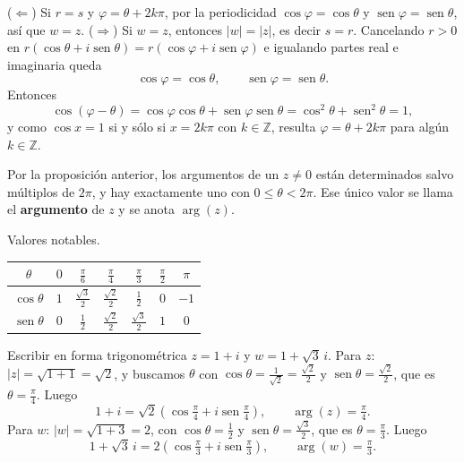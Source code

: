 \begin{demostracion}
($\Leftarrow$) Si $r=s$ y $\varphi=\theta+2k\pi$, por la periodicidad
$\cos\varphi=\cos\theta$ y $\operatorname{sen}\varphi=\operatorname{sen}\theta$,
así que $w=z$.
($\Rightarrow$) Si $w=z$, entonces $|w|=|z|$, es decir $s=r$. Cancelando $r>0$ en
$r(\cos\theta+i\operatorname{sen}\theta)=r(\cos\varphi+i\operatorname{sen}\varphi)$
e igualando partes real e imaginaria queda
\[
\cos\varphi=\cos\theta, \qquad \operatorname{sen}\varphi=\operatorname{sen}\theta.
\]
Entonces
\[
\cos(\varphi-\theta)=\cos\varphi\cos\theta+\operatorname{sen}\varphi\operatorname{sen}\theta
=\cos^2\theta+\operatorname{sen}^2\theta=1,
\]
y como $\cos x=1$ si y sólo si $x=2k\pi$ con $k\in\mathbb{Z}$, resulta
$\varphi=\theta+2k\pi$ para algún $k\in\mathbb{Z}$.
\end{demostracion}
\begin{definicion}
Por la proposición anterior, los argumentos de un $z\neq 0$ están determinados
salvo múltiplos de $2\pi$, y hay exactamente uno con $0\le\theta<2\pi$. Ese
único valor se llama el \textbf{argumento} de $z$ y se anota $\arg(z)$.
\end{definicion}
\begin{nota}{Valores notables.}
\begin{center}
\renewcommand{\arraystretch}{1.8}
\begin{tabular}{|c|c|c|c|c|c|c|}
\hline
$\theta$ & $0$ & $\frac{\pi}{6}$ & $\frac{\pi}{4}$ & $\frac{\pi}{3}$ & $\frac{\pi}{2}$ & $\pi$ \\
\hline
$\cos\theta$ & $1$ & $\frac{\sqrt{3}}{2}$ & $\frac{\sqrt{2}}{2}$ & $\frac{1}{2}$ & $0$ & $-1$ \\
\hline
$\operatorname{sen}\theta$ & $0$ & $\frac{1}{2}$ & $\frac{\sqrt{2}}{2}$ & $\frac{\sqrt{3}}{2}$ & $1$ & $0$ \\
\hline
\end{tabular}
\end{center}
\end{nota}
\begin{ejemplo}
Escribir en forma trigonométrica $z=1+i$ y $w=1+\sqrt{3}\,i$.
Para $z$: $|z|=\sqrt{1+1}=\sqrt{2}$, y buscamos $\theta$ con
$\cos\theta=\tfrac{1}{\sqrt{2}}=\tfrac{\sqrt{2}}{2}$ y
$\operatorname{sen}\theta=\tfrac{\sqrt{2}}{2}$, que es $\theta=\tfrac{\pi}{4}$. Luego
\[
1+i=\sqrt{2}\left(\cos\tfrac{\pi}{4}+i\operatorname{sen}\tfrac{\pi}{4}\right),
\qquad \arg(z)=\tfrac{\pi}{4}.
\]
Para $w$: $|w|=\sqrt{1+3}=2$, con $\cos\theta=\tfrac{1}{2}$ y
$\operatorname{sen}\theta=\tfrac{\sqrt{3}}{2}$, que es $\theta=\tfrac{\pi}{3}$. Luego
\[
1+\sqrt{3}\,i=2\left(\cos\tfrac{\pi}{3}+i\operatorname{sen}\tfrac{\pi}{3}\right),
\qquad \arg(w)=\tfrac{\pi}{3}.
\]
\end{ejemplo}
